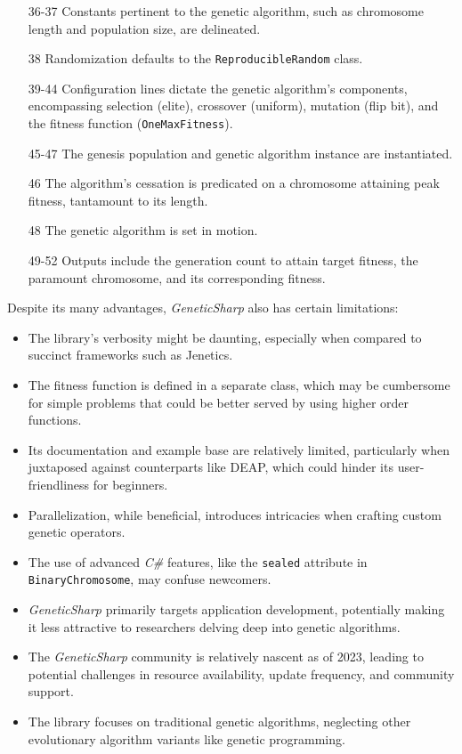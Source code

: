 \begin{enumerate}
\begin{enumerate}
      \end{enumerate}
    \item[36-37] Constants pertinent to the genetic algorithm, such as 
      chromosome length and population size, are delineated.
    \item[38] Randomization defaults to the \texttt{ReproducibleRandom} class.
    \item[39-44] Configuration lines dictate the genetic algorithm's components, 
      encompassing selection (elite), crossover (uniform), mutation (flip bit), 
      and the fitness function (\texttt{OneMaxFitness}).
    \item[45-47] The genesis population and genetic algorithm instance are 
      instantiated.
    \item[46] The algorithm's cessation is predicated on a chromosome attaining 
      peak fitness, tantamount to its length.
    \item[48] The genetic algorithm is set in motion.
    \item[49-52] Outputs include the generation count to attain target fitness, 
      the paramount chromosome, and its corresponding fitness.
  \end{enumerate}

  Despite its many advantages, \textit{GeneticSharp} also has certain 
  limitations:

  \begin{itemize}
    \item The library's verbosity might be daunting, especially when compared to 
      succinct frameworks such as Jenetics.
    \item The fitness function is defined in a separate class, which may be 
      cumbersome for simple problems that could be better served by using higher
      order functions.
    \item Its documentation and example base are relatively limited, 
      particularly when juxtaposed against counterparts like DEAP, which could 
      hinder its user-friendliness for beginners.
    \item Parallelization, while beneficial, introduces intricacies when 
      crafting custom genetic operators.
    \item The use of advanced \textit{C\#} features, like the 
      \texttt{sealed} attribute in 
      \texttt{BinaryChromosome}, may confuse newcomers.
    \item \textit{GeneticSharp} primarily targets application development, 
      potentially making it less attractive to researchers delving deep into 
      genetic algorithms.
    \item The \textit{GeneticSharp} community is relatively nascent as of 2023, 
      leading to potential challenges in resource availability, update frequency, 
      and community support.
    \item The library focuses on traditional genetic algorithms, neglecting other 
      evolutionary algorithm variants like genetic programming.
  \end{itemize}

